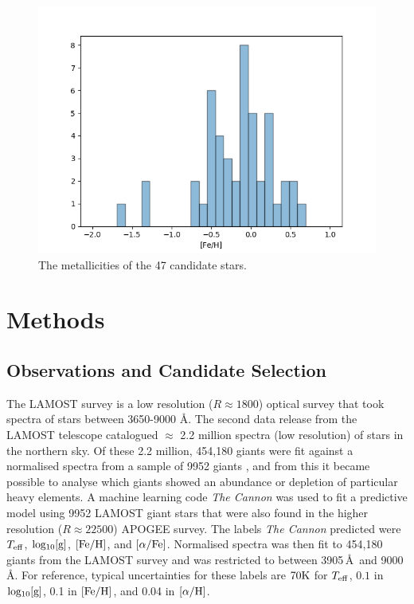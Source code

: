 \documentclass[a4paper,fleqn,usenatbib]{mnras}
\begin{document}
	\begin{figure}
		\includegraphics[width=\columnwidth]{metalhistpython}
		\caption{The metallicities of the 47 candidate stars.}
		\label{fig:metallicity}
	\end{figure}
	
	\section{Methods}
	
	\subsection{Observations and Candidate Selection}
	
	The LAMOST survey is a low resolution ($R\approx1800$) optical survey that took spectra of stars between 3650-9000 \AA. The second data release from the LAMOST telescope catalogued $\approx$ 2.2 million spectra (low resolution) of stars in the northern sky. Of these 2.2 million, 454,180 giants were fit against a normalised spectra from a sample of 9952 giants \citep{AnnaHo2017}, and from this it became possible to analyse which giants showed an abundance or depletion of particular heavy elements. A machine learning code \textit{The Cannon} was used to fit a predictive model using 9952 LAMOST giant stars that were also found in the higher resolution ($R\approx22500$) APOGEE survey. The labels \textit{The Cannon} predicted were $T_{\rm{eff}}$, $\rm{log_{10}[g]}$, $\rm{[Fe/H]}$, and $\rm{[\alpha/Fe]}$. Normalised spectra was then fit to 454,180 giants from the LAMOST survey and was restricted to between 3905\,\AA\ and 9000\,\AA. For reference, typical uncertainties for these labels are $70\rm{K}$ for $T_{\rm{eff}}$, $0.1$ in $\rm{log_{10}[g]}$, 0.1 in $\rm{[Fe/H]}$, and 0.04 in $\rm{[\alpha/H]}$.
	
\end{document}
